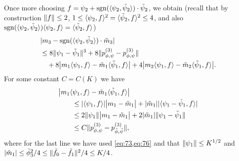 \documentclass[journal]{IEEEtran}
\newcommand{\sgn}{\mathrm{sgn}}
\newcommand{\1}{\boldsymbol{1}}
\DeclarePairedDelimiter{\Inner}{\langle}{\rangle}
\DeclarePairedDelimiter{\norm}{\lVert}{\rVert}
\DeclarePairedDelimiter{\abs}{\lvert}{\rvert}
\begin{document}
Once more choosing $f = \psi_2 + \sgn(\Inner{\psi_2,\tilde{\psi}_2})\cdot\tilde{\psi}_2$, we
obtain (recall that by construction $\norm{f} \leq 2$,
$1\leq \Inner{\psi_2,f}^2 = \Inner{\tilde{\psi}_2,f}^2 \leq 4$, and also
$\sgn(\Inner{\psi_2,\tilde{\psi}_2})\Inner{\psi_2,f} = \Inner{\tilde{\psi}_2,f}$)
\begin{align*}
	&\abs{m_3 - \sgn(\Inner{\psi_2,\tilde{\psi}_2})\cdot \tilde{m}_3}\\%
	&\leq 8\norm{\psi_1 - \tilde{\psi}_1}^3+ 8\norm{p_{\phi,\psi}^{(3)} - p_{\phi,\psi}^{(3)}}\\
	&\quad+ 8\abs[\big]{ m_1\Inner{\psi_1,f} - \tilde{m}_1\Inner{\tilde{\psi}_1,f}}
	+ 4\abs[\big]{m_2\Inner{\psi_1,f} - \tilde{m}_2\Inner{\tilde{\psi}_1,f}}.
\end{align*}
For some constant $C=C(K)$ we have
\begin{align*}
	&\abs[\big]{ m_1\Inner{\psi_1,f} - \tilde{m}_1 \Inner{\tilde{\psi}_1,f}}\\%
	&\qquad\leq \abs{\Inner{\psi_1,f}}\abs[\big]{ m_1 - \tilde{m}_1}%
	+ \abs{\tilde{m}_1}\abs{\Inner{\psi_1 - \tilde{\psi}_1,f}}\\
	&\qquad\leq 2\norm{\psi_1}\abs[\big]{ m_1 - \tilde{m}_1} %
	+ 2 \abs{\tilde{m}_1}\norm{\psi_1 - \tilde{\psi}_1}\\
	&\qquad\leq C \norm{p_{\phi,\psi}^{(3)} - p_{\tilde{\phi},\tilde{\psi}}^{(3)}},
\end{align*}
where for the last line we have used \cref{eq:73,eq:76} and that $\norm{\psi_1}\leq K^{1/2}$ and $\abs{\tilde{m}_1}\leq \tilde{\phi}_3^2/4 \leq \norm{\tilde{f}_0-\tilde{f}_1}^2/4\leq K/4$.
\end{document}
